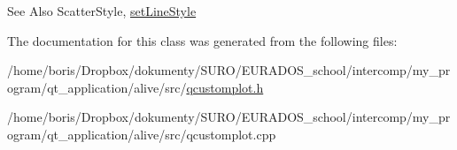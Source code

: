 \begin{DoxySeeAlso}{See Also}
Scatter\-Style, \hyperlink{classQCPGraph_a513fecccff5b2a50ce53f665338c60ff}{set\-Line\-Style} 
\end{DoxySeeAlso}


The documentation for this class was generated from the following files\-:\begin{DoxyCompactItemize}
\item 
/home/boris/\-Dropbox/dokumenty/\-S\-U\-R\-O/\-E\-U\-R\-A\-D\-O\-S\-\_\-school/intercomp/my\-\_\-program/qt\-\_\-application/alive/src/\hyperlink{qcustomplot_8h}{qcustomplot.\-h}\item 
/home/boris/\-Dropbox/dokumenty/\-S\-U\-R\-O/\-E\-U\-R\-A\-D\-O\-S\-\_\-school/intercomp/my\-\_\-program/qt\-\_\-application/alive/src/qcustomplot.\-cpp\end{DoxyCompactItemize}
